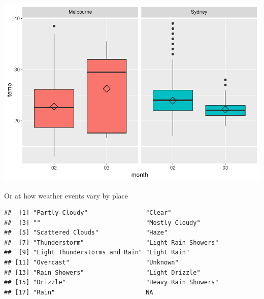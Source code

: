 \documentclass[]{article}
\newenvironment{Shaded}{\begin{snugshade}}{\end{snugshade}}
\newcommand{\CommentTok}[1]{\textcolor[rgb]{0.56,0.35,0.01}{\textit{#1}}}
\newcommand{\KeywordTok}[1]{\textcolor[rgb]{0.13,0.29,0.53}{\textbf{#1}}}
\newcommand{\NormalTok}[1]{#1}
\newcommand{\OperatorTok}[1]{\textcolor[rgb]{0.81,0.36,0.00}{\textbf{#1}}}
\begin{document}
\includegraphics{AT2_template__medium__files/figure-latex/unnamed-chunk-11-1.pdf}

Or at how weather events vary by place

\begin{Shaded}
\end{Shaded}

\begin{verbatim}
##  [1] "Partly Cloudy"                "Clear"                       
##  [3] ""                             "Mostly Cloudy"               
##  [5] "Scattered Clouds"             "Haze"                        
##  [7] "Thunderstorm"                 "Light Rain Showers"          
##  [9] "Light Thunderstorms and Rain" "Light Rain"                  
## [11] "Overcast"                     "Unknown"                     
## [13] "Rain Showers"                 "Light Drizzle"               
## [15] "Drizzle"                      "Heavy Rain Showers"          
## [17] "Rain"                         NA
\end{verbatim}

\begin{Shaded}
\end{Shaded}
\end{document}
